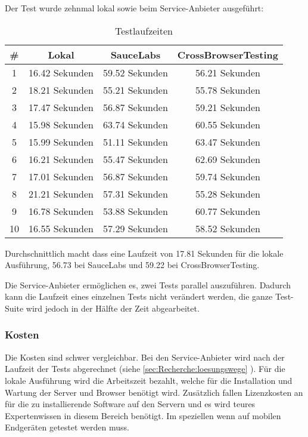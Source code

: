 Der Test wurde zehnmal lokal sowie beim Service-Anbieter ausgeführt:
\begin{table}[H] 
	\caption{Testlaufzeiten}
	\centering
		
	\begin{tabular}{ | c | c | c | c |} 
		\hline 
			\rowcolor{tableheadcolor}
				 \bfseries \# & 
				 \bfseries Lokal & 
				 \bfseries SauceLabs &
				 \bfseries CrossBrowserTesting \\ \hline 
			1 & 16.42 Sekunden & 59.52 Sekunden & 56.21 Sekunden \\ \hline 
			2 & 18.21 Sekunden & 55.21 Sekunden & 55.78 Sekunden \\ \hline 
			3 & 17.47 Sekunden & 56.87 Sekunden & 59.21 Sekunden \\ \hline 
			4 & 15.98 Sekunden & 63.74 Sekunden & 60.55 Sekunden \\ \hline 
			5 & 15.99 Sekunden & 51.11 Sekunden & 63.47 Sekunden \\ \hline 
			6 & 16.21 Sekunden & 55.47 Sekunden & 62.69 Sekunden \\ \hline 
			7 & 17.01 Sekunden & 56.87 Sekunden & 59.74 Sekunden \\ \hline 
			8 & 21.21 Sekunden & 57.31 Sekunden & 55.28 Sekunden \\ \hline 
			9 & 16.78 Sekunden & 53.88 Sekunden & 60.77 Sekunden \\ \hline 
			10 & 16.55 Sekunden & 57.29 Sekunden & 58.52 Sekunden \\ \hline 
	\end{tabular} 
\end{table}
Durchschnittlich macht dass eine Laufzeit von 17.81 Sekunden für die lokale Ausführung, 56.73 bei SauceLabs und 59.22 bei CrossBrowserTesting.

Die Service-Anbieter ermöglichen es, zwei Tests parallel auszuführen. Dadurch kann die Laufzeit eines einzelnen Tests nicht verändert werden, die ganze Test-Suite wird jedoch in der Hälfte der Zeit abgearbeitet.

\subsubsection{Kosten}
Die Kosten sind schwer vergleichbar. Bei den Service-Anbieter wird nach der Laufzeit der Tests abgerechnet (siehe \cref{sec:Recherche:loesungswege} ). Für die lokale Ausführung wird die Arbeitszeit bezahlt, welche für die Installation und Wartung der Server und Browser benötigt wird. Zusätzlich fallen Lizenzkosten an für die zu installierende Software auf den Servern und es wird teures Expertenwissen in diesem Bereich benötigt. Im speziellen wenn auf mobilen Endgeräten getestet werden muss.

